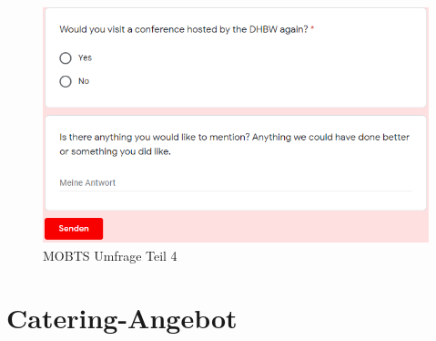 \begin{figure}[h]
	\centering
	\includegraphics[width=10 cm]{img/survey4.png}
	\caption[MOBTS Umfrage]{MOBTS Umfrage Teil 4}
	\label{fig:survey4}
\end{figure}

\chapter{Catering-Angebot}
\label{app:angebot}



